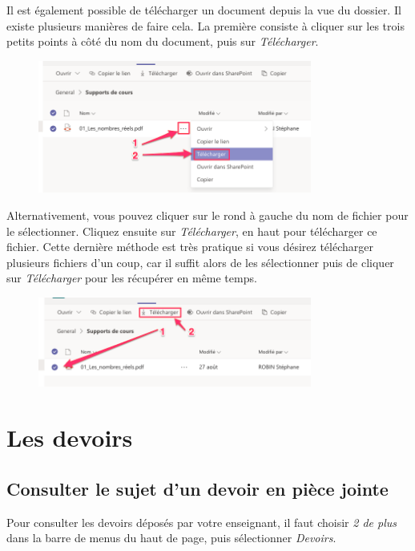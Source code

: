 Il est également possible de télécharger un document depuis la vue du dossier. Il existe plusieurs manières de faire cela. La première consiste à cliquer sur les trois petits points à côté du nom du document, puis sur \textit{Télécharger}.

\begin{figure}[H]
	\includegraphics[width=9cm]{./images/teams/telecharger1_crop}
	\centering
\end{figure}

Alternativement, vous pouvez cliquer sur le rond à gauche du nom de fichier pour le sélectionner. Cliquez ensuite sur \textit{Télécharger}, en haut pour télécharger ce fichier. Cette dernière méthode est très pratique si vous désirez télécharger plusieurs fichiers d'un coup, car il suffit alors de les sélectionner puis de cliquer sur \textit{Télécharger} pour les récupérer en même temps.

\begin{figure}[H]
	\includegraphics[width=9cm]{./images/teams/telecharger2_crop}
	\centering
\end{figure}



\section{Les devoirs}

\subsection{Consulter le sujet d'un devoir en pièce jointe}\label{consulterDevoir}
Pour consulter les devoirs déposés par votre enseignant, il faut choisir \textit{2 de plus} dans la barre de menus du haut de page, puis sélectionner \textit{Devoirs}.

